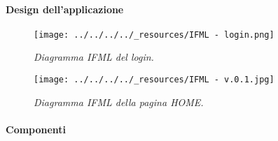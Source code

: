 \hypertarget{design-dellapplicazione}{%
\paragraph{Design dell'applicazione}\label{design-dellapplicazione}}

\begin{figure}
\centering
\texttt{[image: ../../../../\_resources/IFML - login.png]}
\caption{\emph{Diagramma IFML del login.}}
\end{figure}

\begin{figure}
\centering
\texttt{[image: ../../../../\_resources/IFML - v.0.1.jpg]}
\caption{\emph{Diagramma IFML della pagina HOME.}}
\end{figure}

\hypertarget{componenti}{%
\paragraph{Componenti}\label{componenti}}

